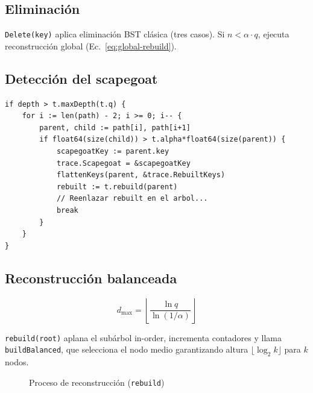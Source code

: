 \subsection{Eliminación}

\texttt{Delete(key)} aplica eliminación BST clásica (tres casos). Si $n < \alpha \cdot q$, ejecuta reconstrucción global (Ec.~\ref{eq:global-rebuild}).

\subsection{Detección del scapegoat}

\begin{lstlisting}[style=gocode,caption={Fragmento de detección de scapegoat en inserción},label={lst:scapegoat}]
if depth > t.maxDepth(t.q) {
    for i := len(path) - 2; i >= 0; i-- {
        parent, child := path[i], path[i+1]
        if float64(size(child)) > t.alpha*float64(size(parent)) {
            scapegoatKey := parent.key
            trace.Scapegoat = &scapegoatKey
            flattenKeys(parent, &trace.RebuiltKeys)
            rebuilt := t.rebuild(parent)
            // Reenlazar rebuilt en el arbol...
            break
        }
    }
}
\end{lstlisting}

\subsection{Reconstrucción balanceada}

\begin{equation}
  d_{\max} = \left\lfloor \frac{\ln q}{\ln (1/\alpha)} \right\rfloor
\end{equation}

\texttt{rebuild(root)} aplana el subárbol in-order, incrementa contadores y llama \texttt{buildBalanced}, que selecciona el nodo medio garantizando altura $\lfloor \log_2 k \rfloor$ para $k$ nodos.

\begin{figure}[H]
  \centering
  \caption{Proceso de reconstrucción (\texttt{rebuild})}
  \label{fig:rebuild}
\end{figure}

